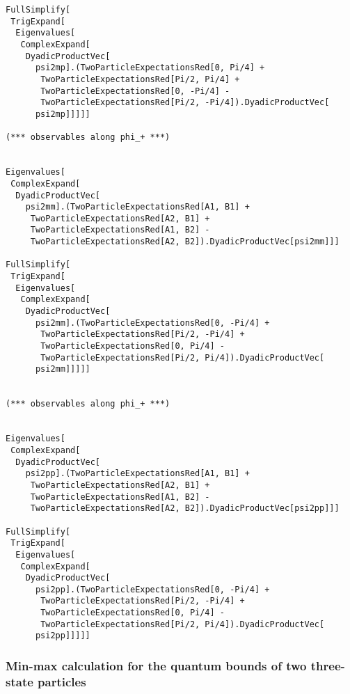 \documentclass[%
 showpacs,
 showkeys,
 preprintnumbers,
 amsmath,amssymb,
 aps,
  pra,
  longbibliography,
 floatfix,
 ]{revtex4-1}
\begin{document}
{\begin{lstlisting}[backgroundcolor=\color{yellow!10},framerule=0pt,breaklines=true, frame=tb]
FullSimplify[
 TrigExpand[
  Eigenvalues[
   ComplexExpand[
    DyadicProductVec[
      psi2mp].(TwoParticleExpectationsRed[0, Pi/4] +
       TwoParticleExpectationsRed[Pi/2, Pi/4] +
       TwoParticleExpectationsRed[0, -Pi/4] -
       TwoParticleExpectationsRed[Pi/2, -Pi/4]).DyadicProductVec[
      psi2mp]]]]]

(*** observables along phi_+ ***)


Eigenvalues[
 ComplexExpand[
  DyadicProductVec[
    psi2mm].(TwoParticleExpectationsRed[A1, B1] +
     TwoParticleExpectationsRed[A2, B1] +
     TwoParticleExpectationsRed[A1, B2] -
     TwoParticleExpectationsRed[A2, B2]).DyadicProductVec[psi2mm]]]

FullSimplify[
 TrigExpand[
  Eigenvalues[
   ComplexExpand[
    DyadicProductVec[
      psi2mm].(TwoParticleExpectationsRed[0, -Pi/4] +
       TwoParticleExpectationsRed[Pi/2, -Pi/4] +
       TwoParticleExpectationsRed[0, Pi/4] -
       TwoParticleExpectationsRed[Pi/2, Pi/4]).DyadicProductVec[
      psi2mm]]]]]


(*** observables along phi_+ ***)


Eigenvalues[
 ComplexExpand[
  DyadicProductVec[
    psi2pp].(TwoParticleExpectationsRed[A1, B1] +
     TwoParticleExpectationsRed[A2, B1] +
     TwoParticleExpectationsRed[A1, B2] -
     TwoParticleExpectationsRed[A2, B2]).DyadicProductVec[psi2pp]]]

FullSimplify[
 TrigExpand[
  Eigenvalues[
   ComplexExpand[
    DyadicProductVec[
      psi2pp].(TwoParticleExpectationsRed[0, -Pi/4] +
       TwoParticleExpectationsRed[Pi/2, -Pi/4] +
       TwoParticleExpectationsRed[0, Pi/4] -
       TwoParticleExpectationsRed[Pi/2, Pi/4]).DyadicProductVec[
      psi2pp]]]]]

\end{lstlisting}  }


\subsubsection{Min-max calculation for the quantum bounds of two three-state particles}
\end{document}
